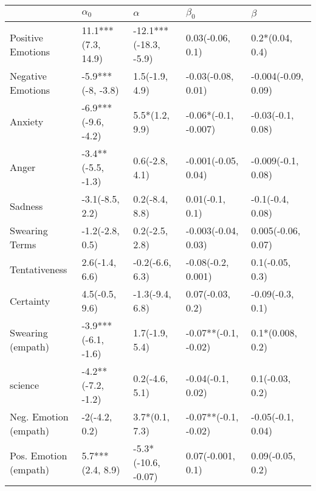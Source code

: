 \begin{tabular}{lllll}
\toprule
{} &           $\alpha_0$ &               $\alpha$ &             $\beta_0$ &              $\beta$ \\
\midrule
Positive Emotions     &   11.1***(7.3, 14.9) &  -12.1***(-18.3, -5.9) &      0.03(-0.06, 0.1) &      0.2*(0.04, 0.4) \\
Negative Emotions     &    -5.9***(-8, -3.8) &         1.5(-1.9, 4.9) &    -0.03(-0.08, 0.01) &  -0.004(-0.09, 0.09) \\
Anxiety               &  -6.9***(-9.6, -4.2) &         5.5*(1.2, 9.9) &  -0.06*(-0.1, -0.007) &    -0.03(-0.1, 0.08) \\
Anger                 &   -3.4**(-5.5, -1.3) &         0.6(-2.8, 4.1) &   -0.001(-0.05, 0.04) &   -0.009(-0.1, 0.08) \\
Sadness               &      -3.1(-8.5, 2.2) &         0.2(-8.4, 8.8) &       0.01(-0.1, 0.1) &     -0.1(-0.4, 0.08) \\
Swearing Terms        &      -1.2(-2.8, 0.5) &         0.2(-2.5, 2.8) &   -0.003(-0.04, 0.03) &   0.005(-0.06, 0.07) \\
Tentativeness         &       2.6(-1.4, 6.6) &        -0.2(-6.6, 6.3) &    -0.08(-0.2, 0.001) &      0.1(-0.05, 0.3) \\
Certainty             &       4.5(-0.5, 9.6) &        -1.3(-9.4, 6.8) &      0.07(-0.03, 0.2) &     -0.09(-0.3, 0.1) \\
Swearing (empath)     &  -3.9***(-6.1, -1.6) &         1.7(-1.9, 5.4) &  -0.07**(-0.1, -0.02) &     0.1*(0.008, 0.2) \\
science               &   -4.2**(-7.2, -1.2) &         0.2(-4.6, 5.1) &     -0.04(-0.1, 0.02) &      0.1(-0.03, 0.2) \\
Neg. Emotion (empath) &        -2(-4.2, 0.2) &         3.7*(0.1, 7.3) &  -0.07**(-0.1, -0.02) &    -0.05(-0.1, 0.04) \\
Pos. Emotion (empath) &     5.7***(2.4, 8.9) &    -5.3*(-10.6, -0.07) &     0.07(-0.001, 0.1) &     0.09(-0.05, 0.2) \\
\bottomrule
\end{tabular}
